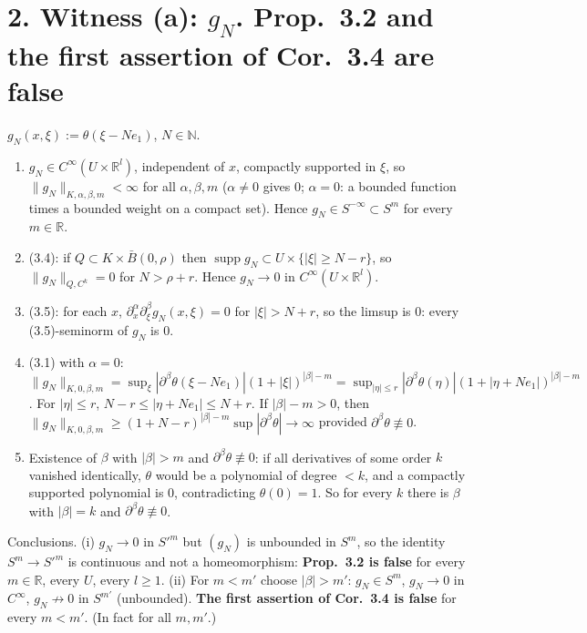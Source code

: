 \documentclass[11pt]{article}
\newcommand{\R}{\mathbb{R}}
\newcommand{\N}{\mathbb{N}}
\newcommand{\supp}{\operatorname{supp}}
\begin{document}
\section*{2. Witness (a): $g_N$. Prop.~3.2 and the first assertion of Cor.~3.4 are false}
$g_N(x,\xi):=\theta(\xi-Ne_1)$, $N\in\N$.
\begin{enumerate}
\item $g_N\in C^\infty(U\times\R^l)$, independent of $x$, compactly supported in $\xi$, so $\|g_N\|_{K,\alpha,\beta,m}<\infty$ for all $\alpha,\beta,m$ ($\alpha\ne0$ gives $0$; $\alpha=0$: a bounded function times a bounded weight on a compact set). Hence $g_N\in S^{-\infty}\subset S^m$ for every $m\in\R$.
\item (3.4): if $Q\subset K\times\bar B(0,\rho)$ then $\supp g_N\subset U\times\{|\xi|\ge N-r\}$, so $\|g_N\|_{Q,C^k}=0$ for $N>\rho+r$. Hence $g_N\to0$ in $C^\infty(U\times\R^l)$.
\item (3.5): for each $x$, $\partial^\alpha_x\partial^\beta_\xi g_N(x,\xi)=0$ for $|\xi|>N+r$, so the limsup is $0$: every (3.5)-seminorm of $g_N$ is $0$.
\item (3.1) with $\alpha=0$: $\|g_N\|_{K,0,\beta,m}=\sup_\xi|\partial^\beta\theta(\xi-Ne_1)|(1+|\xi|)^{|\beta|-m}=\sup_{|\eta|\le r}|\partial^\beta\theta(\eta)|(1+|\eta+Ne_1|)^{|\beta|-m}$. For $|\eta|\le r$, $N-r\le|\eta+Ne_1|\le N+r$. If $|\beta|-m>0$, then $\|g_N\|_{K,0,\beta,m}\ge(1+N-r)^{|\beta|-m}\sup|\partial^\beta\theta|\to\infty$ provided $\partial^\beta\theta\not\equiv0$.
\item Existence of $\beta$ with $|\beta|>m$ and $\partial^\beta\theta\not\equiv0$: if all derivatives of some order $k$ vanished identically, $\theta$ would be a polynomial of degree $<k$, and a compactly supported polynomial is $0$, contradicting $\theta(0)=1$. So for every $k$ there is $\beta$ with $|\beta|=k$ and $\partial^\beta\theta\not\equiv0$.
\end{enumerate}
Conclusions. (i) $g_N\to0$ in $S'^m$ but $(g_N)$ is unbounded in $S^m$, so the identity $S^m\to S'^m$ is continuous and not a homeomorphism: \textbf{Prop.~3.2 is false} for every $m\in\R$, every $U$, every $l\ge1$. (ii) For $m<m'$ choose $|\beta|>m'$: $g_N\in S^m$, $g_N\to0$ in $C^\infty$, $g_N\not\to0$ in $S^{m'}$ (unbounded). \textbf{The first assertion of Cor.~3.4 is false} for every $m<m'$. (In fact for all $m,m'$.)
\end{document}
